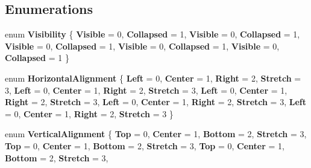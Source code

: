 \subsection*{Enumerations}
\begin{DoxyCompactItemize}
\item 
\mbox{\label{namespace_windows_1_1_u_i_1_1_xaml_ab3fbc626243929a7adbc7f2170933135}} 
enum {\bfseries Visibility} \{ \newline
{\bfseries Visible} = 0, 
{\bfseries Collapsed} = 1, 
{\bfseries Visible} = 0, 
{\bfseries Collapsed} = 1, 
\newline
{\bfseries Visible} = 0, 
{\bfseries Collapsed} = 1, 
{\bfseries Visible} = 0, 
{\bfseries Collapsed} = 1, 
\newline
{\bfseries Visible} = 0, 
{\bfseries Collapsed} = 1
 \}
\item 
\mbox{\label{namespace_windows_1_1_u_i_1_1_xaml_a296d6e339e45f69b5f76a1183a51fef6}} 
enum {\bfseries Horizontal\+Alignment} \{ \newline
{\bfseries Left} = 0, 
{\bfseries Center} = 1, 
{\bfseries Right} = 2, 
{\bfseries Stretch} = 3, 
\newline
{\bfseries Left} = 0, 
{\bfseries Center} = 1, 
{\bfseries Right} = 2, 
{\bfseries Stretch} = 3, 
\newline
{\bfseries Left} = 0, 
{\bfseries Center} = 1, 
{\bfseries Right} = 2, 
{\bfseries Stretch} = 3, 
\newline
{\bfseries Left} = 0, 
{\bfseries Center} = 1, 
{\bfseries Right} = 2, 
{\bfseries Stretch} = 3, 
\newline
{\bfseries Left} = 0, 
{\bfseries Center} = 1, 
{\bfseries Right} = 2, 
{\bfseries Stretch} = 3
 \}
\item 
\mbox{\label{namespace_windows_1_1_u_i_1_1_xaml_adfb3c11d5572410fe610ae02feb31cd1}} 
enum {\bfseries Vertical\+Alignment} \{ \newline
{\bfseries Top} = 0, 
{\bfseries Center} = 1, 
{\bfseries Bottom} = 2, 
{\bfseries Stretch} = 3, 
\newline
{\bfseries Top} = 0, 
{\bfseries Center} = 1, 
{\bfseries Bottom} = 2, 
{\bfseries Stretch} = 3, 
\newline
{\bfseries Top} = 0, 
{\bfseries Center} = 1, 
{\bfseries Bottom} = 2, 
{\bfseries Stretch} = 3, 

\end{DoxyCompactItemize}
